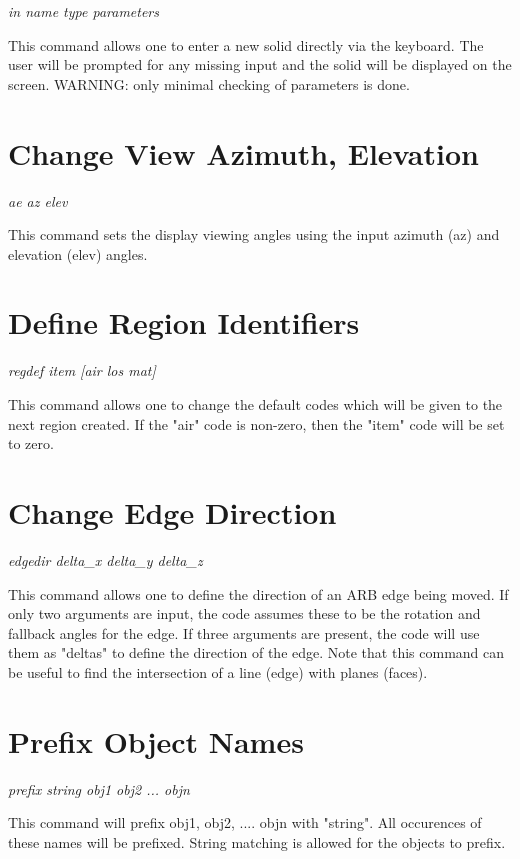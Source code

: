 {\em \center
in name type {parameters}
}

This command allows one to enter a new solid directly via the keyboard.
The user will be prompted for any missing input and the solid will be
displayed on the screen.  WARNING: only minimal checking of parameters
is done.

\section{Change View Azimuth, Elevation}

{\em \center
ae az elev
}

This command sets the display viewing angles using the input azimuth (az)
and elevation (elev) angles.

\section{Define Region Identifiers}

{\em \center
regdef item [air los mat]
}

This command allows one to change the default codes which will be given
to the next region created.
If the "air" code is non-zero, then the "item" code will be set to zero.

\section{Change Edge Direction}

{\em \center
edgedir delta\_x delta\_y delta\_z
}

This command allows one to define the direction of an ARB edge being moved.
If only two arguments are input, the code assumes these to be the
rotation and fallback angles for the edge.
If three arguments are present, the code will use them as "deltas" to
define the direction of the edge.
Note that this command can be useful to find the intersection of
a line (edge) with planes (faces).

\section{Prefix Object Names}

{\em \center
prefix string obj1 obj2 ... objn
}

This command will prefix obj1, obj2, .... objn with "string".  All occurences
of these names will be prefixed.  String matching is allowed for the objects
to prefix.

